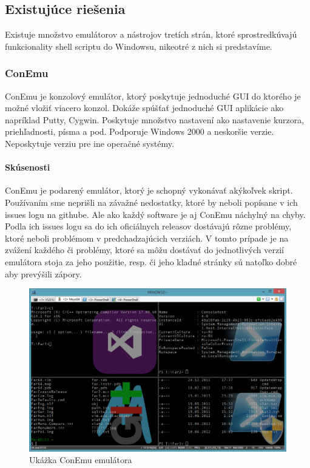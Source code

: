 \subsection{Existujúce riešenia}
\indent
Existuje množstvo emulátorov a nástrojov tretích strán, ktoré sprostredkúvajú funkcionality shell scriptu do Windowsu, nikeotré z nich si predstavíme.

\subsubsection{ConEmu}
\indent ConEmu je konzolový emulátor, ktorý poskytuje jednoduché GUI do ktorého je možné vložiť viacero konzol. Dokáže spúšťať jednoduché GUI aplikácie ako napríklad Putty, Cygwin. Poskytuje množstvo nastavení ako nastavenie kurzora, priehľadnosti, písma a pod. Podporuje Windows 2000 a neskoršie verzie. Neposkytuje verziu pre ine operačné systémy. \cite{conemu}
\paragraph{Skúsenosti}
\indent ConEmu je podarený emulátor, ktorý je schopný vykonávať akýkoľvek skript. Používaním sme neprišli na závažné nedostatky, ktoré by neboli popísane v ich issues logu na githube. Ale ako každý software je aj ConEmu náchylný na chyby. Podla ich issues logu sa do ich oficiálnych releasov dostávajú rôzne problémy, ktoré neboli problémom v predchadzajúcich verziách. V tomto prípade je na zvážení každého či problémy, ktoré sa môžu dostávať do jednotlivých verzií emulátora stoja za jeho použitie, resp. či jeho kladné stránky sú natoľko dobré aby prevýšili zápory.

\begin{figure}[!htbp]
\centering
\includegraphics[scale=0.3]{img/conEmuImg.jpg}
\caption{Ukážka ConEmu emulátora}
\label{fig:test}
\end{figure}
\newpage
